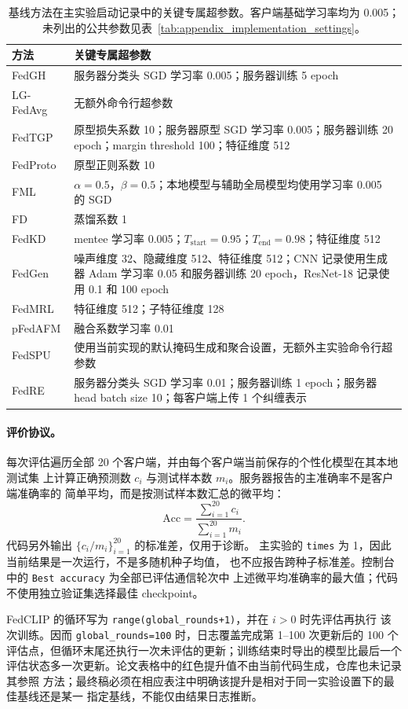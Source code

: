 \begin{table}[t]
\centering
\caption{基线方法在主实验启动记录中的关键专属超参数。客户端基础学习率均为
0.005；未列出的公共参数见表~\ref{tab:appendix_implementation_settings}。}
\label{tab:appendix_baseline_key_hparams}
\small
\setlength{\tabcolsep}{5pt}
\renewcommand{\arraystretch}{1.12}
\begin{tabularx}{\textwidth}{@{}lX@{}}
\toprule
\textbf{方法} & \textbf{关键专属超参数} \\
\midrule
FedGH & 服务器分类头 SGD 学习率 0.005；服务器训练 5 epoch \\
LG-FedAvg & 无额外命令行超参数 \\
FedTGP & 原型损失系数 10；服务器原型 SGD 学习率 0.005；服务器训练 20 epoch；margin threshold 100；特征维度 512 \\
FedProto & 原型正则系数 10 \\
FML & $\alpha=0.5$，$\beta=0.5$；本地模型与辅助全局模型均使用学习率 0.005 的 SGD \\
FD & 蒸馏系数 1 \\
FedKD & mentee 学习率 0.005；$T_{\mathrm{start}}=0.95$；$T_{\mathrm{end}}=0.98$；特征维度 512 \\
FedGen & 噪声维度 32、隐藏维度 512、特征维度 512；CNN 记录使用生成器 Adam 学习率 0.05 和服务器训练 20 epoch，ResNet-18 记录使用 0.1 和 100 epoch \\
FedMRL & 特征维度 512；子特征维度 128 \\
pFedAFM & 融合系数学习率 0.01 \\
FedSPU & 使用当前实现的默认掩码生成和聚合设置，无额外主实验命令行超参数 \\
FedRE & 服务器分类头 SGD 学习率 0.01；服务器训练 1 epoch；服务器 head batch size 10；每客户端上传 1 个纠缠表示 \\
\bottomrule
\end{tabularx}
\end{table}

\paragraph{评价协议。}
每次评估遍历全部 20 个客户端，并由每个客户端当前保存的个性化模型在其本地测试集
上计算正确预测数 $c_i$ 与测试样本数 $m_i$。服务器报告的主准确率不是客户端准确率的
简单平均，而是按测试样本数汇总的微平均：
\begin{equation}
\mathrm{Acc}=\frac{\sum_{i=1}^{20}c_i}{\sum_{i=1}^{20}m_i}.
\end{equation}
代码另外输出 $\{c_i/m_i\}_{i=1}^{20}$ 的标准差，仅用于诊断。
主实验的 \texttt{times} 为 1，因此当前结果是一次运行，不是多随机种子均值，
也不应报告跨种子标准差。控制台中的 \texttt{Best accuracy} 为全部已评估通信轮次中
上述微平均准确率的最大值；代码不使用独立验证集选择最佳 checkpoint。

FedCLIP 的循环写为 \texttt{range(global\_rounds+1)}，并在 $i>0$ 时先评估再执行
该次训练。因而 \texttt{global\_rounds=100} 时，日志覆盖完成第 1--100 次更新后的
100 个评估点，但循环末尾还执行一次未评估的更新；训练结束时导出的模型比最后一个
评估状态多一次更新。论文表格中的红色提升值不由当前代码生成，仓库也未记录其参照
方法；最终稿必须在相应表注中明确该提升是相对于同一实验设置下的最佳基线还是某一
指定基线，不能仅由结果日志推断。
